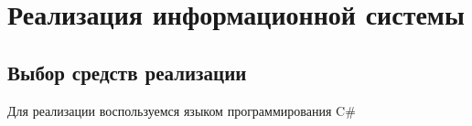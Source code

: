 \section{Реализация информационной системы}
\subsection{Выбор средств реализации}
Для реализации воспользуемся языком программирования C#

\pagebreak
